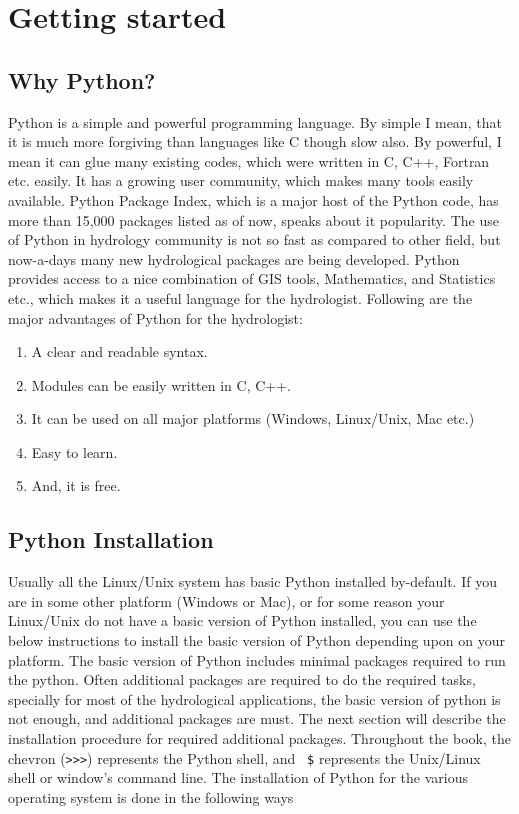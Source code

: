 \documentclass[10pt]{book}
\begin{document}
\mainmatter


\chapter{Getting started}

\section{Why Python?}
Python is a simple and powerful programming language. 
By simple I mean, that it is much more forgiving than languages like 
C though slow also. By powerful, I mean it can glue many existing codes,  
which were written in C, C++, Fortran etc. easily. 
It has a growing user community, which makes many tools easily available. 
Python Package Index, which is a major host of the Python code, 
has more than 15,000 packages listed as of now, speaks about it popularity. 
The use of Python in hydrology community is not so fast as compared to other field, 
but now-a-days many new hydrological packages are being developed. 
Python provides access to a nice combination of GIS tools, Mathematics, 
and Statistics etc., which makes it a useful language for the hydrologist. 
Following are the major advantages of Python for the hydrologist:
\begin{enumerate}
\item A clear and readable syntax. \
\item Modules can be easily written in C, C++. \
\item It can be used on all major platforms (Windows, Linux/Unix, Mac etc.) \
\item Easy to learn. \
\item And, it is free. \
\end{enumerate}

\index{Why Python}

\section{Python Installation}
Usually all the Linux/Unix system has basic Python installed by-default. If you are in
some other platform (Windows or Mac), or for some reason your Linux/Unix do not have 
a basic version of Python installed, you can use the below instructions to install the 
basic version of Python depending upon on your platform.  
The basic version of Python includes minimal packages required to run the python. 
Often additional packages are required to do the required tasks, specially for most 
of the hydrological applications, the basic version of python is not enough, 
and additional packages are must. The next section will describe the installation 
procedure for required additional packages. 
Throughout the book, the chevron (\verb">>>") represents the Python shell, 
and {\verb" $"} represents the Unix/Linux shell or window's command line. 
The installation of Python for the various operating system is done in the 
following ways
\end{document}
